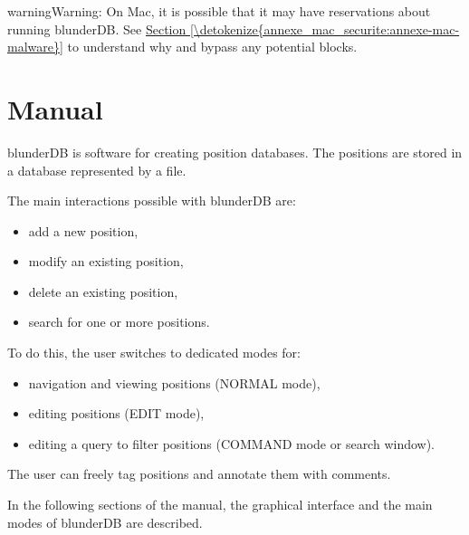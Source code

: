 \documentclass[letterpaper,10pt,english]{sphinxmanual}
\begin{document}
\begin{sphinxadmonition}{warning}{Warning:}
\sphinxAtStartPar
On Mac, it is possible that it may have reservations about running blunderDB. See \hyperref[\detokenize{annexe_mac_securite:annexe-mac-malware}]{Section \ref{\detokenize{annexe_mac_securite:annexe-mac-malware}}} to understand why and bypass any potential blocks.
\end{sphinxadmonition}

\sphinxstepscope


\section{Manual}
\label{\detokenize{manuel:manuel}}\label{\detokenize{manuel:id1}}\label{\detokenize{manuel::doc}}
\sphinxAtStartPar
blunderDB is software for creating position databases. The positions are stored in a database represented by a  file.

\sphinxAtStartPar
The main interactions possible with blunderDB are:
\begin{itemize}
\item {} 
\sphinxAtStartPar
add a new position,

\item {} 
\sphinxAtStartPar
modify an existing position,

\item {} 
\sphinxAtStartPar
delete an existing position,

\item {} 
\sphinxAtStartPar
search for one or more positions.

\end{itemize}

\sphinxAtStartPar
To do this, the user switches to dedicated modes for:
\begin{itemize}
\item {} 
\sphinxAtStartPar
navigation and viewing positions (NORMAL mode),

\item {} 
\sphinxAtStartPar
editing positions (EDIT mode),

\item {} 
\sphinxAtStartPar
editing a query to filter positions (COMMAND mode or search window).

\end{itemize}

\sphinxAtStartPar
The user can freely tag positions and annotate them with comments.

\sphinxAtStartPar
In the following sections of the manual, the graphical interface and the main modes of blunderDB are described.
\end{document}

